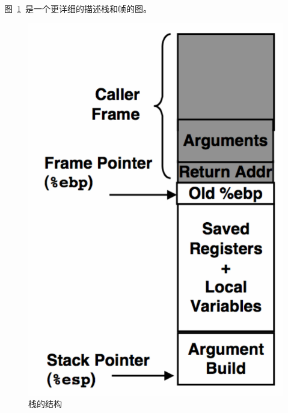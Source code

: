 图~\ref{fig:stack}~是一个更详细的描述栈和帧的图。
\begin{figure}
\begin{center}
\includegraphics[scale=0.3]{figure/stack}
\caption{栈的结构} \label{fig:stack}
\end{center}
\end{figure}

